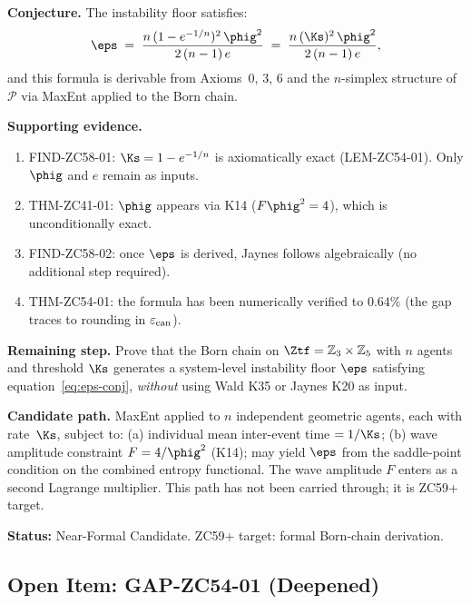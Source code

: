 \documentclass[12pt, a4paper]{article}
\begin{document}
\begin{derivedbox}[title={CONJ-ZC58-01: Born-Chain Derivation
  of $\eps$ (Near-Formal Candidate, $R_0$)}]
\textbf{Conjecture.}
The instability floor satisfies:
\begin{equation}
  \eps
  \;=\; \frac{n\,(1-e^{-1/n})^2\,\phig^2}{2\,(n-1)\,e}
  \;=\; \frac{n\,(\Ks)^2\,\phig^2}{2\,(n-1)\,e},
  \label{eq:eps-conj}
\end{equation}
and this formula is derivable from Axioms~0, 3, 6 and the
$n$-simplex structure of $\mathcal{P}$ via MaxEnt applied
to the Born chain.

\textbf{Supporting evidence.}
\begin{enumerate}[leftmargin=2em, noitemsep]
\item FIND-ZC58-01: $\Ks=1-e^{-1/n}$ is axiomatically exact
  (LEM-ZC54-01).  Only $\phig$ and $e$ remain as inputs.
\item THM-ZC41-01: $\phig$ appears via K14 ($F\phig^2=4$),
  which is unconditionally exact.
\item FIND-ZC58-02: once $\eps$ is derived, Jaynes follows
  algebraically (no additional step required).
\item THM-ZC54-01: the formula has been numerically verified
  to $0.64\%$ (the gap traces to rounding in $\varepsilon_{\rm can}$).
\end{enumerate}

\textbf{Remaining step.}
Prove that the Born chain on $\Ztf=\mathbb{Z}_3\times\mathbb{Z}_5$
with $n$ agents and threshold $\Ks$ generates a system-level
instability floor $\eps$ satisfying equation~\eqref{eq:eps-conj},
\emph{without} using Wald K35 or Jaynes K20 as input.

\textbf{Candidate path.}
MaxEnt applied to $n$ independent geometric agents, each with
rate~$\Ks$, subject to:
(a) individual mean inter-event time $=1/\Ks$;
(b) wave amplitude constraint $F=4/\phig^2$ (K14);
may yield $\eps$ from the saddle-point condition on the combined
entropy functional.  The wave amplitude $F$ enters as a second
Lagrange multiplier.  This path has not been carried through;
it is ZC59+ target.

\textbf{Status:} Near-Formal Candidate.
ZC59+ target: formal Born-chain derivation.
\end{derivedbox}

\subsection{Open Item: GAP-ZC54-01 (Deepened)}
\end{document}

